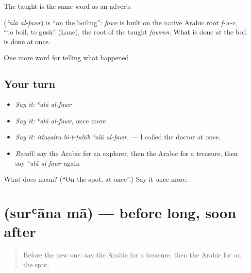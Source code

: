 The taught  is the same word as an adverb.

\begin{cousinweb}
\textbf{ } (\emph{ʿalā al-fawr}) is \textquotedblleft{}on the boiling\textquotedblright{}: \emph{fawr} is built on the native Arabic root \emph{f-w-r}, \textquotedblleft{}to boil, to gush\textquotedblright{} (Lane), the root of the taught \emph{fawran}. What is done at the boil is done at once.
\end{cousinweb}

\begin{grammarlens}[title={What you've built}]
One more word for telling what happened.
\end{grammarlens}

\subsection*{Your turn}
\begin{itemize}
\raggedright
  \item \emph{Say it:} \emph{ʿalā al-fawr}
  \item \emph{Say it:} \emph{ʿalā al-fawr}, once more
  \item \emph{Say it:} \emph{ittaṣaltu bi-ṭ-ṭabīb ʿalā al-fawr.} — I called the doctor at once.
  \item \emph{Recall:} say the Arabic for an explorer, then the Arabic for a treasure, then say \emph{ʿalā al-fawr} again
\end{itemize}

\begin{tcolorbox}[breakable,colback=teal!4,colframe=teal!35!black,title={Before you move on}]
What does   mean? (\textquotedblleft{}On the spot, at once\textquotedblright{}.) Say it once more.
\end{tcolorbox}
\section[\texorpdfstring{\ar{سرعان} \ar{ما} (surʿāna mā)}{سرعان ما (surʿāna mā)}]{  (surʿāna mā) — before long, soon after}

\label{lesson:AR-C313-suraana-ma}



\begin{quote}
Before the new one: say the Arabic for a treasure, then the Arabic for on the spot.
\end{quote}

